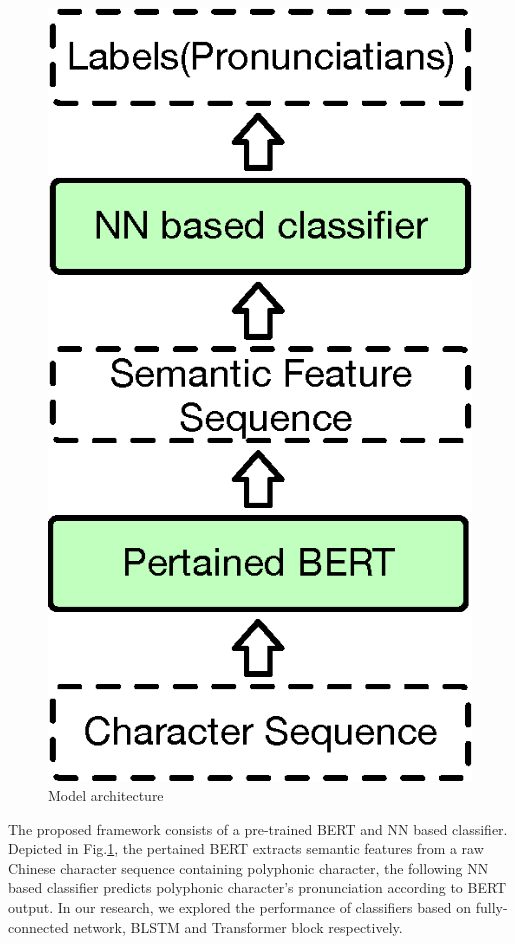 \documentclass[a4paper]{article}
\begin{document}
\begin{figure}[t]
	\centering
	\includegraphics[scale=0.45]{pics3/architecture2.eps}
	\caption{Model architecture}
	\label{fig:model_architecture}
\end{figure}

The proposed framework consists of a pre-trained BERT and NN based classifier. Depicted in  Fig.\ref{fig:model_architecture}, the pertained BERT extracts semantic features from a raw Chinese character sequence containing polyphonic character, the following NN based classifier predicts polyphonic character's pronunciation according to BERT output. In our research, we explored the performance of classifiers based on fully-connected network, BLSTM and Transformer block respectively.
\end{document}
